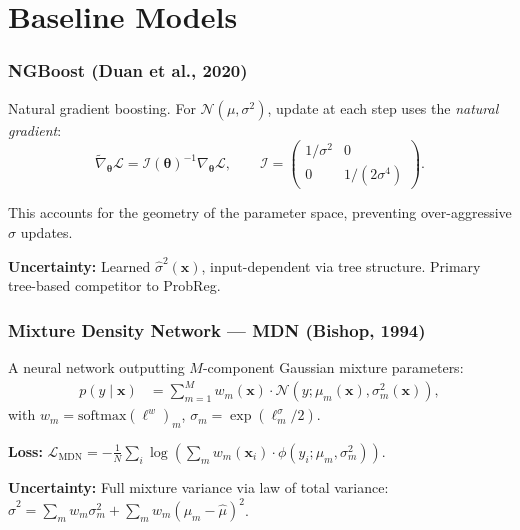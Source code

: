 \documentclass[11pt,a4paper]{article}
\theoremstyle{definition}
\newcommand{\bx}{\mathbf{x}}
\newcommand{\btheta}{\boldsymbol{\theta}}
\newcommand{\softmax}{\mathrm{softmax}}
\begin{document}
\part{Baseline Models}

\section{NGBoost (Duan et al., 2020)}

Natural gradient boosting. For $\mathcal{N}(\mu, \sigma^2)$, update at each
step uses the \emph{natural gradient}:
\[
  \tilde{\nabla}_\btheta \mathcal{L} = \mathcal{I}(\btheta)^{-1} \nabla_\btheta \mathcal{L},
  \qquad
  \mathcal{I} = \begin{pmatrix} 1/\sigma^2 & 0 \\ 0 & 1/(2\sigma^4) \end{pmatrix}.
\]

This accounts for the geometry of the parameter space, preventing
over-aggressive $\sigma$ updates.

\textbf{Uncertainty:} Learned $\hat{\sigma}^2(\bx)$, input-dependent via
tree structure. Primary tree-based competitor to ProbReg.

\section{Mixture Density Network --- MDN (Bishop, 1994)}

A neural network outputting $M$-component Gaussian mixture parameters:
\begin{align}
  p(y \mid \bx) &= \sum_{m=1}^{M} w_m(\bx) \cdot \mathcal{N}(y; \mu_m(\bx), \sigma_m^2(\bx)),
\end{align}
with $w_m = \softmax(\ell^w)_m$, $\sigma_m = \exp(\ell^\sigma_m / 2)$.

\textbf{Loss:}
$\mathcal{L}_{\mathrm{MDN}} = -\frac{1}{N}\sum_{i} \log\left(\sum_{m} w_m(\bx_i) \cdot \phi(y_i; \mu_m, \sigma_m^2)\right)$.

\textbf{Uncertainty:} Full mixture variance via law of total variance:
$\hat{\sigma}^2 = \sum_m w_m \sigma_m^2 + \sum_m w_m(\mu_m - \hat{\mu})^2$.
\end{document}
